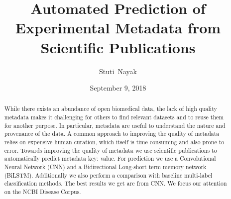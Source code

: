 \documentclass[10pt]{reportMaster}
\title{Automated Prediction of Experimental Metadata from Scientific Publications}
\author{Stuti\ Nayak}
\date{September 9, 2018}
\begin{document}
\maketitle
\begin{abstract}
    While there exists an abundance of open biomedical data, the lack of high quality metadata makes it challenging for others to find relevant datasets and to reuse them for another purpose. In particular, metadata are useful to understand the nature and provenance of the data. A common approach to improving the quality of metadata relies on expensive human curation, which itself is time consuming and also prone to error. Towards improving the quality of metadata we use scientific publications to automatically predict metadata key: value. For prediction we use a Convolutional Neural Network (CNN) and  a Bidirectional Long-short term memory network (BiLSTM). Additionally we also perform a comparison with baseline multi-label classification methods. The best results we get are from CNN. We focus our attention on the NCBI Disease Corpus. 
\end{abstract}

\renewcommand{\abstractname}{Acknowledgements}
\begin{abstract}
 
 
\end{abstract}

\tableofcontents

\listoffigures
 
\listoftables








%

%




\end{document}

